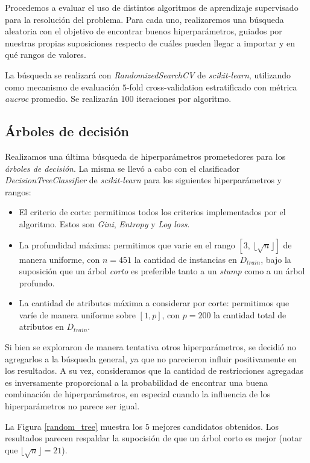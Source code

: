 Procedemos a evaluar el uso de distintos algoritmos de aprendizaje supervisado para la resolución del problema. Para cada uno, realizaremos una búsqueda aleatoria con el objetivo de encontrar buenos hiperparámetros, guiados por nuestras propias suposiciones respecto de cuáles pueden llegar a importar y en qué rangos de valores.

La búsqueda se realizará con \textit{RandomizedSearchCV} de \textit{scikit-learn}, utilizando como mecanismo de evaluación $5$-fold cross-validation estratificado con métrica \textit{aucroc} promedio. Se realizarán $100$ iteraciones por algoritmo.

\subsection{Árboles de decisión}
Realizamos una última búsqueda de hiperparámetros prometedores para los \textit{árboles de decisión}. La misma se llevó a cabo con el clasificador \textit{DecisionTreeClassifier} de \textit{scikit-learn} para los siguientes hiperparámetros y rangos: 

\begin{itemize}
    \item El criterio de corte: permitimos todos los criterios implementados por el algoritmo. Estos son \textit{Gini}, \textit{Entropy} y \textit{Log loss}. 
    \item La profundidad máxima: permitimos que varie en el rango $[3,\ \lfloor\sqrt{n} \rfloor]$ de manera uniforme, con $n=451$ la cantidad de instancias en $D_{train}$, bajo la suposición que un árbol \textit{corto} es preferible tanto a un \textit{stump} como a un árbol profundo.
    \item La cantidad de atributos máxima a considerar por corte: permitimos que varíe de manera uniforme sobre $[1, p]$, con $p = 200$ la cantidad total de atributos en $D_{train}$.
\end{itemize}

Si bien se exploraron de manera tentativa otros hiperparámetros, se decidió no agregarlos a la búsqueda general, ya que no parecieron influir positivamente en los resultados. A su vez, consideramos que la cantidad de restricciones agregadas es inversamente proporcional a la probabilidad de encontrar una buena combinación de hiperparámetros, en especial cuando la influencia de los hiperparámetros no parece ser igual. 

La Figura \ref{random_tree} muestra los $5$ mejores candidatos obtenidos. Los resultados parecen respaldar la supocisión de que un árbol corto es mejor (notar que $\lfloor\sqrt{n} \rfloor = 21$).

